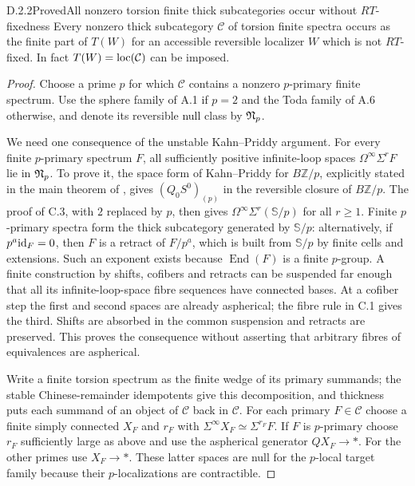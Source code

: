 \begin{claim}{D.2.2}{Proved}{All nonzero torsion finite thick subcategories occur without $RT$-fixedness}
Every nonzero thick subcategory $\mathcal C$ of torsion finite spectra occurs as the finite part of $T(W)$ for an accessible reversible localizer $W$ which is not $RT$-fixed. In fact $T(W)=\operatorname{loc}(\mathcal C)$ can be imposed.
\end{claim}
\begin{proof}
Choose a prime $p$ for which $\mathcal C$ contains a nonzero $p$-primary finite spectrum. Use the sphere family of A.1 if $p=2$ and the Toda family of A.6 otherwise, and denote its reversible null class by $\mathfrak N_p$.

We need one consequence of the unstable Kahn--Priddy argument. For every finite $p$-primary spectrum $F$, all sufficiently positive infinite-loop spaces $\Omega^\infty\Sigma^rF$ lie in $\mathfrak N_p$. To prove it, the space form of Kahn--Priddy for $B\mathbb Z/p$, explicitly stated in the main theorem of \citet[p.~103]{KahnPriddy1978}, gives $(Q_0S^0)_{(p)}$ in the reversible closure of $B\mathbb Z/p$. The proof of C.3, with $2$ replaced by $p$, then gives $\Omega^\infty\Sigma^r(\mathbb S/p)$ for all $r\geq1$. Finite $p$-primary spectra form the thick subcategory generated by $\mathbb S/p$: alternatively, if $p^a\mathrm{id}_F=0$, then $F$ is a retract of $F/p^a$, which is built from $\mathbb S/p$ by finite cells and extensions. Such an exponent exists because $\operatorname{End}(F)$ is a finite $p$-group. A finite construction by shifts, cofibers and retracts can be suspended far enough that all its infinite-loop-space fibre sequences have connected bases. At a cofiber step the first and second spaces are already aspherical; the fibre rule in C.1 gives the third. Shifts are absorbed in the common suspension and retracts are preserved. This proves the consequence without asserting that arbitrary fibres of equivalences are aspherical.

Write a finite torsion spectrum as the finite wedge of its primary summands; the stable Chinese-remainder idempotents give this decomposition, and thickness puts each summand of an object of $\mathcal C$ back in $\mathcal C$. For each primary $F\in\mathcal C$ choose a finite simply connected $X_F$ and $r_F$ with $\Sigma^\infty X_F\simeq\Sigma^{r_F}F$. If $F$ is $p$-primary choose $r_F$ sufficiently large as above and use the aspherical generator $QX_F\to *$. For the other primes use $X_F\to *$. These latter spaces are null for the $p$-local target family because their $p$-localizations are contractible.


\end{proof}
